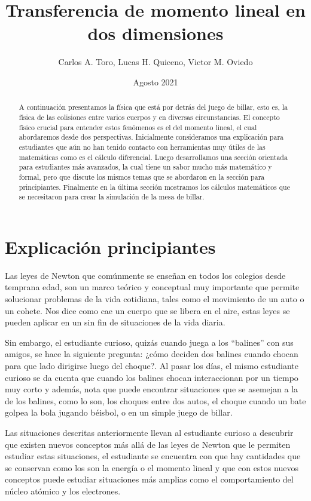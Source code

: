 \documentclass{article}
\title{Transferencia de momento lineal en dos dimensiones}
\author{Carlos A. Toro, Lucas H. Quiceno, Victor M. Oviedo}
\date{Agosto 2021}
\begin{document}
\maketitle
\begin{abstract}
    A continuación presentamos la física que está por detrás del juego de billar, esto es, la física de las colisiones entre varios cuerpos y en diversas circunstancias. El concepto físico crucial para entender estos fenómenos es el del momento lineal, el cual abordaremos desde dos perspectivas. Inicialmente consideramos una explicación para estudiantes que aún no han tenido contacto con herramientas muy útiles de las matemáticas como es el cálculo diferencial. Luego desarrollamos una sección orientada para estudiantes más avanzados, la cual tiene un sabor mucho más matemático y formal, pero que discute los mismos temas que se abordaron en la sección para principiantes. Finalmente en la última sección mostramos los cálculos matemáticos que se necesitaron para crear la simulación de la mesa de billar.
\end{abstract}

\section{Explicación principiantes}
Las leyes de Newton que comúnmente se enseñan en todos los colegios desde temprana edad, son un marco teórico y conceptual muy importante que permite solucionar problemas de la vida cotidiana, tales como el movimiento de un auto o un cohete. Nos dice como cae un cuerpo que se libera en el aire, estas leyes se pueden aplicar en un sin fin de situaciones de la vida diaria.

Sin embargo, el estudiante curioso, quizás cuando juega a los “balines” con sus amigos, se hace la siguiente pregunta: ¿cómo deciden dos balines cuando chocan para que lado dirigirse luego del choque?. Al pasar los días, el mismo estudiante curioso se da cuenta que cuando los balines chocan interaccionan por un tiempo muy corto y además, nota que puede encontrar situaciones que se asemejan a la de los balines, como lo  son, los choques entre dos autos, el choque cuando un bate golpea la bola jugando béisbol, o en un simple juego de billar.

Las situaciones descritas anteriormente llevan al estudiante curioso a descubrir que existen nuevos conceptos más allá de las leyes de Newton que le permiten estudiar estas situaciones, el estudiante se encuentra con que hay cantidades que se conservan como los son la energía o el momento lineal y que con estos nuevos conceptos puede estudiar situaciones más amplias como el comportamiento del núcleo atómico y los electrones.
\end{document}
